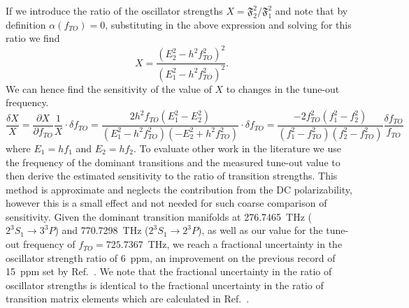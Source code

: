 \documentclass[%
 amsmath,amssymb,
aps,
]{revtex4-2}
\newcommand{\MetastableState}{2^{3\!}S_1}%
\newcommand{\UpperStateManifold}{3^{3\!}P}%
\newcommand{\LowerStateManifold}{2^{3\!}P}%
\begin{document}
If we introduce  the ratio of the oscillator strengths $X=\mathfrak{F}_2^2/\mathfrak{F}_1^2$ and note that by definition \(\alpha(f_{TO})=0\), substituting in the above expression and solving for this ratio we find
\begin{equation}
    X =\frac{ (E_2^2 -h^2 f_{TO}^2 )^2}{(E_1^2-h^2 f_{TO}^2)^2}.
\end{equation}
We can hence find the sensitivity of the value of \(X\) to changes in the tune-out frequency.
\begin{equation}
    \frac{\delta X}{X} = \frac{\partial X} {\partial f_{TO}} \frac{1}{X} \cdot \delta f_{TO} =
    \frac{2  h^2 f_{TO} (E_1^2-E_2^2)}
    {(E_1^2-h^2 f_{TO}^2) (-E_2^2 + h^2 f_{TO}^2 )} \cdot \delta  f_{TO} = \frac{-2 f_{TO}^2 (f_1^2-f_2^2)}{(f_1^2-f_{TO}^2)(f_2^2-f_{TO}^2)} \frac{\delta  f_{TO}}{f_{TO}}
\end{equation}
where \(E_1=h f_1\) and \(E_2=h f_2\).
To evaluate other work in the literature we use the frequency of the dominant transitions and the measured tune-out value to then derive the estimated sensitivity to the ratio of transition strengths. This method is approximate and neglects the contribution from the DC polarizability, however this is a small effect and not needed for such coarse comparison of sensitivity. Given the dominant transition manifolds at 276.7465~THz (\(\MetastableState \to \UpperStateManifold \)) and 770.7298~THz (\(\MetastableState \to \LowerStateManifold\)), as well as our value for the tune-out frequency of \(f_{TO}=725.7367\)~THz, we reach a fractional uncertainty in the oscillator strength ratio of 6~ppm, an improvement on the previous record of 15~ppm set by Ref.~\cite{PhysRevA.92.052501}. We note that the fractional uncertainty in the ratio of oscillator strengths is identical to the fractional uncertainty in the ratio of transition matrix elements which are calculated in Ref.~\cite{PhysRevA.92.052501}.




\end{document}
